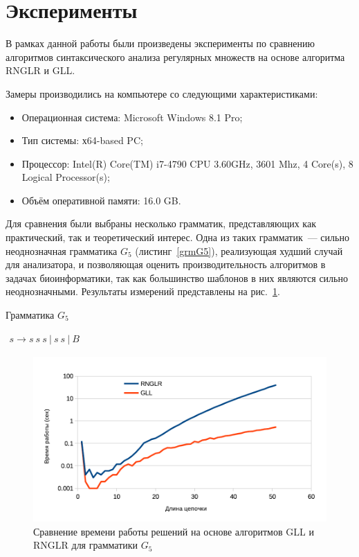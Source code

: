 \section{Эксперименты}
В рамках данной работы были произведены эксперименты по сравнению алгоритмов синтаксического анализа регулярных множеств на основе алгоритма RNGLR и GLL. 

Замеры производились на компьютере со следующими характеристиками:

\begin{itemize}
\item Операционная система: Microsoft Windows 8.1 Pro;
\item Тип системы: х64-based PC;
\item Процессор: Intel(R) Core(TM) i7-4790 CPU 3.60GHz, 3601 Mhz, 4 Core(s), 8 Logical Processor(s);
\item Объём оперативной памяти: 16.0 GB.
\end{itemize}

Для сравнения были выбраны несколько грамматик, представляющих как практический, так и теоретический интерес. Одна из таких грамматик~--- сильно неоднозначная грамматика $G_5$ (листинг~\ref{grmG5}), реализующая худший случай для анализатора, и позволяющая оценить производительность алгоритмов в задачах биоинформатики, так как большинство шаблонов в них являются сильно неоднозначными. Результаты измерений представлены на рис.~\ref{exp1}. 

\begin{listing}
\caption{Грамматика $G_5$}
\label{grmG5}
\centering
$\begin{array}{rl}
s \rightarrow s \ s \ s \ |  \ s \ s \ | \ B 
\end{array}$
\end{listing} 

\begin{figure}
 \centering
 \includegraphics[width=\textwidth]{Ragozina/pics/UmbLog.pdf}
 \caption{Сравнение времени работы решений на основе алгоритмов GLL и RNGLR для грамматики $G_5$}
 \label{exp1}
\end{figure}

